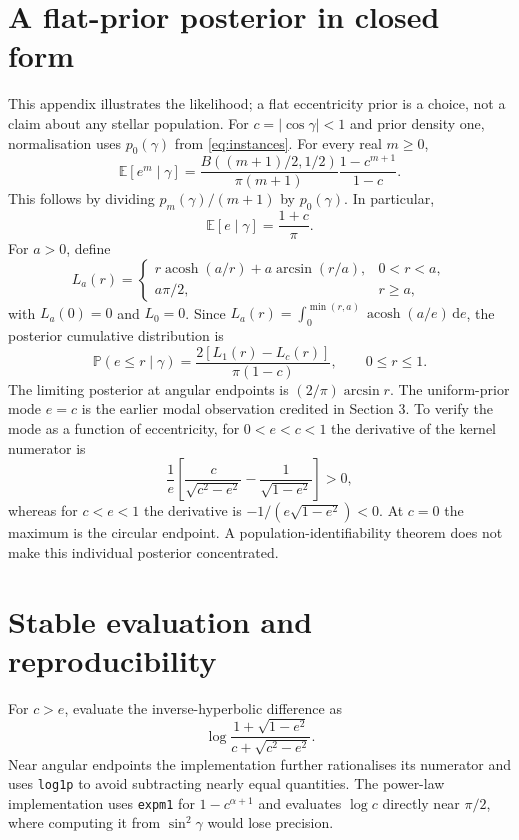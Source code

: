 \documentclass[11pt,a4paper]{article}
\theoremstyle{remark}\newtheorem{remark}[theorem]{Remark}
\DeclareMathOperator{\acosh}{acosh}
\newcommand{\E}{\mathbb E}
\newcommand{\Prob}{\mathbb P}
\newcommand{\dd}{\,\mathrm d}
\begin{document}
\appendix
\section{A flat-prior posterior in closed form}

This appendix illustrates the likelihood; a flat eccentricity prior is a choice, not a claim about any stellar population. For $c=|\cos\gamma|<1$ and prior density one, normalisation uses $p_0(\gamma)$ from \eqref{eq:instances}. For every real $m\ge0$,
\begin{equation}
\E[e^m\mid\gamma]=
\frac{B((m+1)/2,1/2)}{\pi(m+1)}
\frac{1-c^{m+1}}{1-c}.
\end{equation}
This follows by dividing $p_m(\gamma)/(m+1)$ by $p_0(\gamma)$. In particular,
\begin{equation}
\E[e\mid\gamma]=\frac{1+c}{\pi}.
\end{equation}
For $a>0$, define
\begin{equation}
L_a(r)=
\begin{cases}
r\acosh(a/r)+a\arcsin(r/a),&0<r<a,\\
a\pi/2,&r\ge a,
\end{cases}
\end{equation}
with $L_a(0)=0$ and $L_0=0$. Since $L_a(r)=\int_0^{\min(r,a)}\acosh(a/e)\dd e$, the posterior cumulative distribution is
\begin{equation}
\Prob(e\le r\mid\gamma)=\frac{2[L_1(r)-L_c(r)]}{\pi(1-c)},\qquad 0\le r\le1.
\end{equation}
The limiting posterior at angular endpoints is $(2/\pi)\arcsin r$. The uniform-prior mode $e=c$ is the earlier modal observation credited in Section 3. To verify the mode as a function of eccentricity, for $0<e<c<1$ the derivative of the kernel numerator is
\begin{equation}
\frac1e\left[\frac{c}{\sqrt{c^2-e^2}}-\frac1{\sqrt{1-e^2}}\right]>0,
\end{equation}
whereas for $c<e<1$ the derivative is $-1/(e\sqrt{1-e^2})<0$. At $c=0$ the maximum is the circular endpoint. A population-identifiability theorem does not make this individual posterior concentrated.

\section{Stable evaluation and reproducibility}

For $c>e$, evaluate the inverse-hyperbolic difference as
\begin{equation}
\log\frac{1+\sqrt{1-e^2}}{c+\sqrt{c^2-e^2}}.
\end{equation}
Near angular endpoints the implementation further rationalises its numerator and uses \texttt{log1p} to avoid subtracting nearly equal quantities. The power-law implementation uses \texttt{expm1} for $1-c^{\alpha+1}$ and evaluates $\log c$ directly near $\pi/2$, where computing it from $\sin^2\gamma$ would lose precision.
\end{document}
